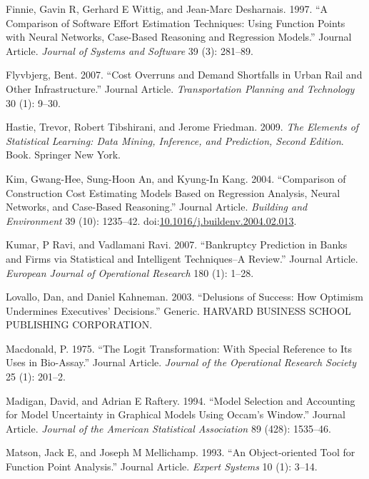 \documentclass[]{elsarticle} %
\begin{document}
\hypertarget{ref-Finnie1997}{}
Finnie, Gavin R, Gerhard E Wittig, and Jean-Marc Desharnais. 1997. ``A
Comparison of Software Effort Estimation Techniques: Using Function
Points with Neural Networks, Case-Based Reasoning and Regression
Models.'' Journal Article. \emph{Journal of Systems and Software} 39
(3): 281--89.

\hypertarget{ref-Flyvbjerg2007}{}
Flyvbjerg, Bent. 2007. ``Cost Overruns and Demand Shortfalls in Urban
Rail and Other Infrastructure.'' Journal Article. \emph{Transportation
Planning and Technology} 30 (1): 9--30.

\hypertarget{ref-Hastie2009}{}
Hastie, Trevor, Robert Tibshirani, and Jerome Friedman. 2009. \emph{The
Elements of Statistical Learning: Data Mining, Inference, and
Prediction, Second Edition}. Book. Springer New York.

\hypertarget{ref-Kim2004}{}
Kim, Gwang-Hee, Sung-Hoon An, and Kyung-In Kang. 2004. ``Comparison of
Construction Cost Estimating Models Based on Regression Analysis, Neural
Networks, and Case-Based Reasoning.'' Journal Article. \emph{Building
and Environment} 39 (10): 1235--42.
doi:\href{https://doi.org/10.1016/j.buildenv.2004.02.013}{10.1016/j.buildenv.2004.02.013}.

\hypertarget{ref-Kumar2007}{}
Kumar, P Ravi, and Vadlamani Ravi. 2007. ``Bankruptcy Prediction in
Banks and Firms via Statistical and Intelligent Techniques--A Review.''
Journal Article. \emph{European Journal of Operational Research} 180
(1): 1--28.

\hypertarget{ref-Lovallo2003}{}
Lovallo, Dan, and Daniel Kahneman. 2003. ``Delusions of Success: How
Optimism Undermines Executives' Decisions.'' Generic. HARVARD BUSINESS
SCHOOL PUBLISHING CORPORATION.

\hypertarget{ref-Macdonald1975}{}
Macdonald, P. 1975. ``The Logit Transformation: With Special Reference
to Its Uses in Bio-Assay.'' Journal Article. \emph{Journal of the
Operational Research Society} 25 (1): 201--2.

\hypertarget{ref-Madigan1994}{}
Madigan, David, and Adrian E Raftery. 1994. ``Model Selection and
Accounting for Model Uncertainty in Graphical Models Using Occam's
Window.'' Journal Article. \emph{Journal of the American Statistical
Association} 89 (428): 1535--46.

\hypertarget{ref-Matson1993}{}
Matson, Jack E, and Joseph M Mellichamp. 1993. ``An Object‐oriented Tool
for Function Point Analysis.'' Journal Article. \emph{Expert Systems} 10
(1): 3--14.
\end{document}
